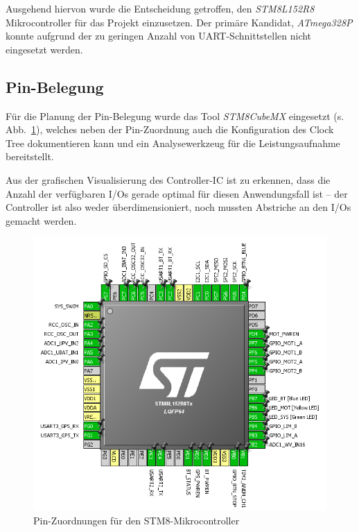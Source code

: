     Ausgehend hiervon wurde die Entscheidung getroffen, den \emph{STM8L152R8} Mikrocontroller für das Projekt einzusetzen. Der primäre Kandidat, \emph{ATmega328P} konnte aufgrund der zu geringen Anzahl von UART-Schnittstellen nicht eingesetzt werden.
    
    \subsection{Pin-Belegung}
    Für die Planung der Pin-Belegung wurde das Tool \emph{STM8CubeMX} eingesetzt (s. Abb.~\ref{fig:mcu_pins}), welches neben der Pin-Zuordnung auch die Konfiguration des Clock Tree dokumentieren kann und ein Analysewerkzeug für die Leistungsaufnahme bereitstellt.
    
    Aus der grafischen Visualisierung des Controller-IC ist zu erkennen, dass die Anzahl der verfügbaren I/Os gerade optimal für diesen Anwendungsfall ist -- der Controller ist also weder überdimensioniert, noch mussten Abstriche an den I/Os gemacht werden.
    
    \begin{figure}[H]
        \centering
        \includegraphics[width=.8\textwidth]{./img/stm8_pinout.PNG}
        \caption{Pin-Zuordnungen für den STM8-Mikrocontroller}
        \label{fig:mcu_pins}
    \end{figure}

